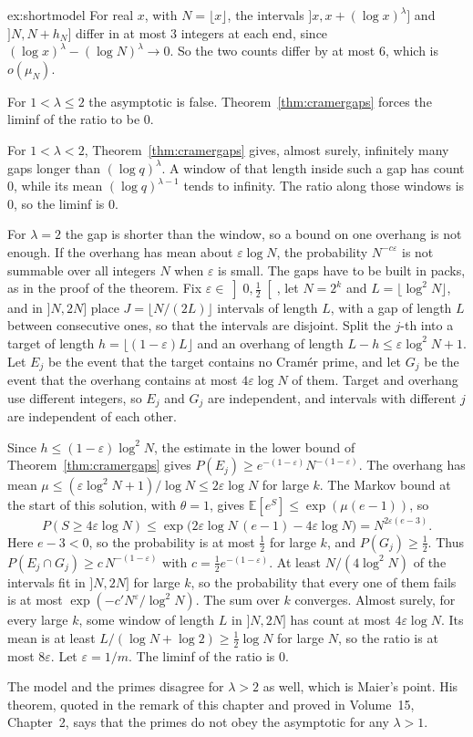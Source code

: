\begin{solution}{ex:shortmodel}
For real $x$, with $N=\lfloor x\rfloor$, the intervals $]x,x+(\log x)^\lambda]$ and $]N,N+h_N]$ differ in at most $3$ integers at each end, since $(\log x)^\lambda-(\log N)^\lambda\to0$. So the two counts differ by at most
$6$, which is $o(\mu_N)$.

For $1<\lambda\le 2$ the asymptotic is false. Theorem~\ref{thm:cramergaps} forces the liminf of the ratio to be $0$.

For $1<\lambda<2$, Theorem~\ref{thm:cramergaps} gives, almost surely, infinitely many gaps longer than $(\log q)^\lambda$. A window of that length inside such a gap has count $0$, while its mean $(\log q)^{\lambda-1}$ tends to infinity. The ratio along those windows is $0$, so the liminf is $0$.

For $\lambda=2$ the gap is shorter than the window, so a bound on one overhang is not enough. If the overhang has mean about $\varepsilon\log N$, the probability $N^{-c\varepsilon}$ is not summable over all integers $N$ when $\varepsilon$ is small. The gaps have to be built in packs, as in the proof of the theorem. Fix $\varepsilon\in\left]0,\frac12\right[$, let $N=2^k$ and $L=\lfloor\log^2 N\rfloor$, and in $]N,2N]$ place $J=\lfloor N/(2L)\rfloor$ intervals of length $L$, with a gap of length $L$ between consecutive ones, so that the intervals are disjoint. Split the $j$-th into a target of length $h=\lfloor(1-\varepsilon)L\rfloor$ and an overhang of length $L-h\le\varepsilon\log^2 N+1$. Let $E_j$ be the event that the target contains no Cramér prime, and let $G_j$ be the event that the overhang contains at most $4\varepsilon\log N$ of them. Target and overhang use different integers, so $E_j$ and $G_j$ are independent, and intervals with different $j$ are independent of each other.

Since $h\le(1-\varepsilon)\log^2 N$, the estimate in the lower bound of Theorem~\ref{thm:cramergaps} gives $P(E_j)\ge e^{-(1-\varepsilon)}N^{-(1-\varepsilon)}$. The overhang has mean $\mu\le(\varepsilon\log^2 N+1)/\log N\le2\varepsilon\log N$ for large $k$. The Markov bound at the start of this solution, with $\theta=1$, gives $\mathbb E[e^{S}]\le\exp(\mu(e-1))$, so
\[
P(S\ge4\varepsilon\log N)\le\exp\bigl(2\varepsilon\log N\,(e-1)-4\varepsilon\log N\bigr)=N^{2\varepsilon(e-3)}.
\]
Here $e-3<0$, so the probability is at most $\frac12$ for large $k$, and $P(G_j)\ge\frac12$. Thus $P(E_j\cap G_j)\ge c\,N^{-(1-\varepsilon)}$ with $c=\frac12 e^{-(1-\varepsilon)}$. At least $N/(4\log^2 N)$ of the intervals fit in $]N,2N]$ for large $k$, so the probability that every one of them fails is at most $\exp(-c'N^\varepsilon/\log^2 N)$. The sum over $k$ converges. Almost surely, for every large $k$, some window of length $L$ in $]N,2N]$ has count at most $4\varepsilon\log N$. Its mean is at least $L/(\log N+\log2)\ge\frac12\log N$ for large $N$, so the ratio is at most $8\varepsilon$. Let $\varepsilon=1/m$. The liminf of the ratio is $0$.

The model and the primes disagree for $\lambda>2$ as well, which is Maier's point. His theorem, quoted in the remark of this chapter and proved in Volume~15, Chapter~2, says that the primes do not obey the asymptotic for any $\lambda>1$.
\end{solution}

